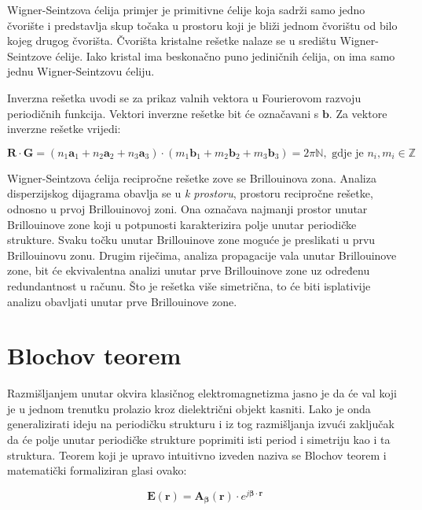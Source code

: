 \documentclass[utf8, seminar, numeric]{fer}
\begin{document}
Wigner-Seintzova ćelija primjer je primitivne ćelije koja sadrži samo jedno
čvorište i predstavlja skup točaka u prostoru koji je bliži jednom čvorištu
od bilo kojeg drugog čvorišta. Čvorišta kristalne rešetke nalaze se u središtu
Wigner-Seintzove ćelije. Iako kristal ima beskonačno puno jediničnih ćelija,
on ima samo jednu Wigner-Seintzovu ćeliju.

Inverzna rešetka uvodi se za prikaz valnih vektora u Fourierovom razvoju
periodičnih funkcija. Vektori inverzne rešetke bit će označavani s $\mathbf{b}$.
Za vektore inverzne rešetke vrijedi:

\begin{equation}
	\mathbf{R} \cdot \mathbf{G} =
	(n_1\mathbf{a}_1 + n_2\mathbf{a}_2 + n_3\mathbf{a}_3)
	\cdot
	(m_1\mathbf{b}_1 + m_2\mathbf{b}_2 + m_3\mathbf{b}_3) = 2 \pi \mathbb{N},
		\text{ gdje je }n_i, m_i \in \mathbb{Z}
\end{equation}

Wigner-Seintzova ćelija recipročne rešetke zove se Brillouinova zona. Analiza
disperzijskog dijagrama obavlja se u \textit{k prostoru}, prostoru recipročne
rešetke, odnosno u prvoj Brillouinovoj zoni. Ona označava najmanji
prostor unutar Brillouinove zone koji u potpunosti karakterizira polje unutar
periodičke strukture. Svaku točku unutar Brillouinove zone moguće je preslikati
u prvu Brillouinovu zonu. Drugim riječima, analiza propagacije vala unutar
Brillouinove zone, bit će ekvivalentna analizi unutar prve Brillouinove zone uz
određenu redundantnost u računu. Što je rešetka više simetrična, to će biti
isplativije analizu obavljati unutar prve Brillouinove zone.


\section{Blochov teorem}

Razmišljanjem unutar okvira klasičnog elektromagnetizma jasno je da će val koji
je u jednom trenutku prolazio kroz dielektrični objekt kasniti. Lako je onda
generalizirati ideju na periodičku strukturu i iz tog razmišljanja izvući
zaključak da će polje unutar periodičke strukture poprimiti isti period i
simetriju kao i ta struktura. Teorem koji je upravo intuitivno izveden naziva
se Blochov teorem i matematički formaliziran glasi ovako:

\begin{equation} \label{eq:bloch}
	\mathbf{E}(\mathbf{r}) =
	\mathbf{A}_{\bm{\beta}}(\mathbf{r}) \cdot
		e^{j {\bm{\beta}} \cdot \mathbf{r}}
\end{equation}
\end{document}
